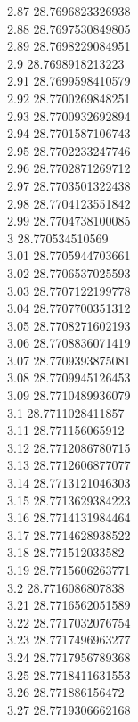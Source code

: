 {2.87	28.7696823326938\\
2.88	28.7697530849805\\
2.89	28.7698229084951\\
2.9	28.7698918213223\\
2.91	28.7699598410579\\
2.92	28.7700269848251\\
2.93	28.7700932692894\\
2.94	28.7701587106743\\
2.95	28.7702233247746\\
2.96	28.7702871269712\\
2.97	28.7703501322438\\
2.98	28.7704123551842\\
2.99	28.7704738100085\\
3	28.770534510569\\
3.01	28.7705944703661\\
3.02	28.7706537025593\\
3.03	28.7707122199778\\
3.04	28.7707700351312\\
3.05	28.7708271602193\\
3.06	28.7708836071419\\
3.07	28.7709393875081\\
3.08	28.7709945126453\\
3.09	28.7710489936079\\
3.1	28.7711028411857\\
3.11	28.771156065912\\
3.12	28.7712086780715\\
3.13	28.7712606877077\\
3.14	28.7713121046303\\
3.15	28.7713629384223\\
3.16	28.7714131984464\\
3.17	28.7714628938522\\
3.18	28.771512033582\\
3.19	28.7715606263771\\
3.2	28.7716086807838\\
3.21	28.7716562051589\\
3.22	28.7717032076754\\
3.23	28.7717496963277\\
3.24	28.7717956789368\\
3.25	28.7718411631553\\
3.26	28.771886156472\\
3.27	28.7719306662168\\
}
